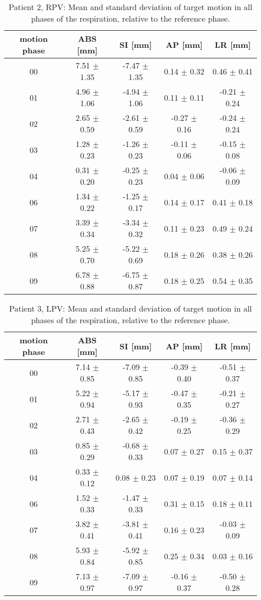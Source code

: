 \begin{table}[H]
  \centering
  \caption{Patient 2, RPV: Mean and standard deviation of target motion in all phases of the respiration, relative to the reference phase.}
  \begin{tabular}{|c|c|c|c|c|}
    \hline\hline
    motion phase & ABS [mm] & SI [mm] & AP [mm] & LR [mm]\\
    \hline 
00& 7.51 $\pm$ 1.35& -7.47 $\pm$ 1.35& 0.14 $\pm$ 0.32& 0.46 $\pm$ 0.41 \\
01& 4.96 $\pm$ 1.06& -4.94 $\pm$ 1.06& 0.11 $\pm$ 0.11& -0.21 $\pm$ 0.24 \\
02& 2.65 $\pm$ 0.59& -2.61 $\pm$ 0.59& -0.27 $\pm$ 0.16& -0.24 $\pm$ 0.24 \\
03& 1.28 $\pm$ 0.23& -1.26 $\pm$ 0.23& -0.11 $\pm$ 0.06& -0.15 $\pm$ 0.08 \\
04& 0.31 $\pm$ 0.20& -0.25 $\pm$ 0.23& 0.04 $\pm$ 0.06& -0.06 $\pm$ 0.09 \\
06& 1.34 $\pm$ 0.22& -1.25 $\pm$ 0.17& 0.14 $\pm$ 0.17& 0.41 $\pm$ 0.18 \\
07& 3.39 $\pm$ 0.34& -3.34 $\pm$ 0.32& 0.11 $\pm$ 0.23& 0.49 $\pm$ 0.24 \\
08& 5.25 $\pm$ 0.70& -5.22 $\pm$ 0.69& 0.18 $\pm$ 0.26& 0.38 $\pm$ 0.26 \\
09& 6.78 $\pm$ 0.88& -6.75 $\pm$ 0.87& 0.18 $\pm$ 0.25& 0.54 $\pm$ 0.35 \\
        \hline\hline
  \end{tabular}
\end{table}


\begin{table}[H]
  \centering
  \caption{Patient 3, LPV: Mean and standard deviation of target motion in all phases of the respiration, relative to the reference phase.}
  \begin{tabular}{|c|c|c|c|c|}
    \hline\hline
    motion phase & ABS [mm] & SI [mm] & AP [mm] & LR [mm]\\
    \hline 
00& 7.14 $\pm$ 0.85& -7.09 $\pm$ 0.85& -0.39 $\pm$ 0.40& -0.51 $\pm$ 0.37 \\
01& 5.22 $\pm$ 0.94& -5.17 $\pm$ 0.93& -0.47 $\pm$ 0.35& -0.21 $\pm$ 0.27 \\
02& 2.71 $\pm$ 0.43& -2.65 $\pm$ 0.42& -0.19 $\pm$ 0.25& -0.36 $\pm$ 0.29 \\
03& 0.85 $\pm$ 0.29& -0.68 $\pm$ 0.33& 0.07 $\pm$ 0.27& 0.15 $\pm$ 0.37 \\
04& 0.33 $\pm$ 0.12& 0.08 $\pm$ 0.23& 0.07 $\pm$ 0.19& 0.07 $\pm$ 0.14 \\
06& 1.52 $\pm$ 0.33& -1.47 $\pm$ 0.33& 0.31 $\pm$ 0.15& 0.18 $\pm$ 0.11 \\
07& 3.82 $\pm$ 0.41& -3.81 $\pm$ 0.41& 0.16 $\pm$ 0.23& -0.03 $\pm$ 0.09 \\
08& 5.93 $\pm$ 0.84& -5.92 $\pm$ 0.85& 0.25 $\pm$ 0.34& 0.03 $\pm$ 0.16 \\
09& 7.13 $\pm$ 0.97& -7.09 $\pm$ 0.97& -0.16 $\pm$ 0.37& -0.50 $\pm$ 0.28 \\
        \hline\hline
  \end{tabular}
\end{table}

